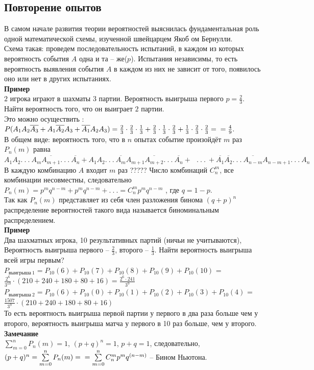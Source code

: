 \documentclass[russian, 12pt, fleqn]{article}
\begin{document}
\subsection{Повторение опытов}
В самом начале развития теории вероятностей выяснилась фундаментальная роль одной математической схемы, изученной швейцарцем Якоб	ом Бернулли.\\
Схема такая: проведем последовательность испытаний, в каждом из которых вероятность события $A$ одна и та -- же($p$). Испытания независимы, то есть вероятность выявления события $A$ в каждом из них не зависит от того, появилось оно или нет в других испытаниях.\\
\textbf{Пример\ }\\ $2$ игрока играют в шахматы $3$ партии. Вероятность выигрыша первого $p = \frac{2}{3}$. Найти вероятность того, что он выиграет $2$ партии.\\
Это можно осуществить : $P(A_1A_2\overline{A_3} + A_1\overline{A_2}A_3 + \overline{A_1}A_2A_3)=\frac{2}{3}\cdot\frac{2}{3}\cdot\frac{1}{3} + \frac{2}{3}\cdot\frac{1}{3}\cdot\frac{2}{3} + \frac{1}{3}\cdot\frac{2}{3}\cdot\frac{2}{3} =\\ = \frac{4}{9}.$\\
В общем виде: вероятность того, что в $n$ опытах событие произойдёт $m$ раз $P_n(m)$ равна $A_1A_2.\ . \ . \ A_m\overline{A_{m+1}}.\ .\ .\ \overline{A_n} + 
A_1A_2.\ . \ . \ \overline{A_m} A_{m+1} \overline{A_{m+2}} .\ .\ .\ \overline{A_n} +
\ \ \ .\ .\ .\ 
+\overline{A_1}\overline{A_2}.\ . \ . \ \overline{A_{n-m}} {A_{n-m+1}} .\ .\ .\ A_n$
В каждую комбинацию $A$ входит $m$ раз ?????%
Число комбинаций $C^m_n$, все комбинации несовместны, следовательно $P_n(m) = p^mq^{n-m} + p^mq^{n-m} + .\ .\ . = C^m_np^mq^{n-m}$ , где $q = 1 - p$.\\
Так как ${P_n(m)}$ представляет из себя член разложения бинома {$(q+p)^n$}\\
 распределение вероятностей такого вида называется биноминальным распределением.\\
\textbf{Пример\ }\\
Два шахматных игрока, 10 результативных партий (ничьи не учитываются), Вероятность выигрыша первого -- $\frac{2}{3}$, второго -- $\frac{1}{3}$. Найти вероятность выигрыша
 всей игры первым?\\
$P_{выигрыша\ 1} = P_{10}(6) + P_{10}(7) + P_{10}(8) + P_{10}(9) +  P_{10}(10)$ = $\frac{2^6}{3^{10}}\cdot(210+240+180+80+16) = \frac{2^6\cdot241}{3^{9}}$
$P_{выигрыша\ 2} = P_{10}(6) + P_{10}(0) + P_{10}(1) + P_{10}(2) +  P_{10}(3)  +  P_{10}(4)$ = $\frac{1507}{3^{9}}\cdot(210+240+180+80+16)$\\
То есть вероятность выигрыша первой партии у первого в два раза больше чем у второго, вероятность выигрыша матча у первого в 10 раз больше, чем у второго.\\
\textbf{Замечание\ } \\
$\sum\limits_{m = 0}^{n}P_n(m) = 1$, $(p+q)^n=1$, $p+q = 1$, следовательно, $(p+q)^n = \sum\limits_{m = 0}^{n}P_n(m)  =\\= \sum\limits_{m = 0}^{n}C^m_np^mq^{(n-m)}$ -- Бином Ньютона.\\
\end{document}
